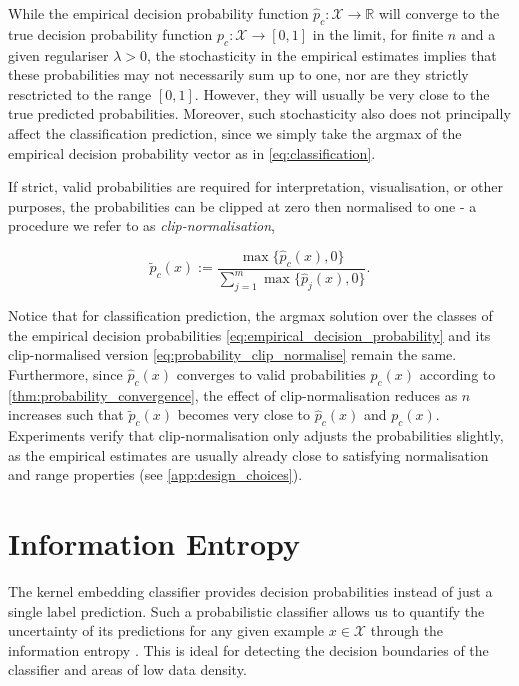 \documentclass{article}
\begin{document}
	While the empirical decision probability function $\hat{p}_{c} : \mathcal{X} \to \mathbb{R}$ will converge to the true decision probability function  $p_{c} : \mathcal{X} \to [0, 1]$ in the limit, for finite $n$ and a given regulariser $\lambda > 0$, the stochasticity in the empirical estimates implies that these probabilities may not necessarily sum up to one, nor are they strictly resctricted to the range $[0, 1]$. However, they will usually be very close to the true predicted probabilities. Moreover, such stochasticity also does not principally affect the classification prediction, since we simply take the argmax of the empirical decision probability vector as in \eqref{eq:classification}.
	
	If strict, valid probabilities are required for interpretation, visualisation, or other purposes, the probabilities can be clipped at zero then normalised to one - a procedure we refer to as \textit{clip-normalisation},
	
	\begin{equation}
		\tilde{p}_{c}(x) := \frac{\max\{\hat{p}_{c}(x), 0\}}{\sum_{j = 1}^{m} \max\{\hat{p}_{j}(x), 0\}}.
	\label{eq:probability_clip_normalise}
	\end{equation}
	
	Notice that for classification prediction, the argmax solution over the classes of the empirical decision probabilities \eqref{eq:empirical_decision_probability} and its clip-normalised version \eqref{eq:probability_clip_normalise} remain the same. Furthermore, since $\hat{p}_{c}(x)$ converges to valid probabilities $p_{c}(x)$ according to \cref{thm:probability_convergence}, the effect of clip-normalisation reduces as $n$ increases such that $\tilde{p}_{c}(x)$ becomes very close to $\hat{p}_{c}(x)$ and $p_{c}(x)$. Experiments verify that clip-normalisation only adjusts the probabilities slightly, as the empirical estimates are usually already close to satisfying normalisation and range properties (see \cref{app:design_choices}).
	
\section{Information Entropy}
\label{sec:information_entropy}

	The kernel embedding classifier provides decision probabilities instead of just a single label prediction. Such a probabilistic classifier allows us to quantify the uncertainty of its predictions for any given example $x \in \mathcal{X}$ through the information entropy \citep{shannon1951prediction, jaynes1957information}. This is ideal for detecting the decision boundaries of the classifier and areas of low data density.
	
\end{document}
